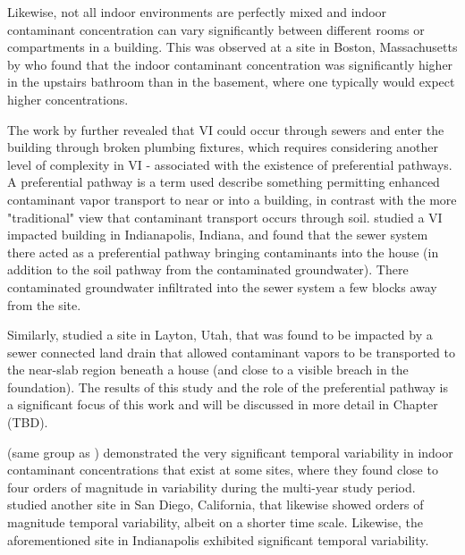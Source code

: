 Likewise, not all indoor environments are perfectly mixed and indoor contaminant concentration can vary significantly between different rooms or compartments in a building.
This was observed at a site in Boston, Massachusetts by \citeauthor{pennell_sewer_2013}\cite{pennell_sewer_2013} who found that the indoor contaminant concentration was significantly higher in the upstairs bathroom than in the basement, where one typically would expect higher concentrations.\par

The work by \citeauthor{pennell_sewer_2013}\cite{pennell_sewer_2013} further revealed that VI could occur through sewers and enter the building through broken plumbing fixtures, which requires considering another level of complexity in VI - associated with the existence of preferential pathways.
A preferential pathway is a term used describe something permitting enhanced contaminant vapor transport to near or into a building, in contrast with the more "traditional" view that contaminant transport occurs through soil.
\citeauthor{mchugh_evidence_2017}\cite{mchugh_evidence_2017} studied a VI impacted building in Indianapolis, Indiana, and found that the sewer system there acted as a preferential pathway bringing contaminants into the house (in addition to the soil pathway from the contaminated groundwater).
There contaminated groundwater infiltrated into the sewer system a few blocks away from the site.\par

Similarly, \citeauthor{guo_identification_2015}\cite{guo_identification_2015} studied a site in Layton, Utah, that was found to be impacted by a sewer connected land drain that allowed contaminant vapors to be transported to the near-slab region beneath a house (and close to a visible breach in the foundation).
The results of this study and the role of the preferential pathway is a significant focus of this work and will be discussed in more detail in Chapter (TBD).\par

\citeauthor{holton_temporal_2013}\cite{holton_temporal_2013} (same group as \citeauthor{guo_identification_2015}) demonstrated the very significant temporal variability in indoor contaminant concentrations that exist at some sites, where they found close to four orders of magnitude in variability during the multi-year study period.
\citeauthor{hosangadi_high-frequency_2017}\cite{hosangadi_high-frequency_2017} studied another site in San Diego, California, that likewise showed orders of magnitude temporal variability, albeit on a shorter time scale.
Likewise, the aforementioned site in Indianapolis exhibited significant temporal variability\cite{schumacher_fluctuation_2012}.\par

